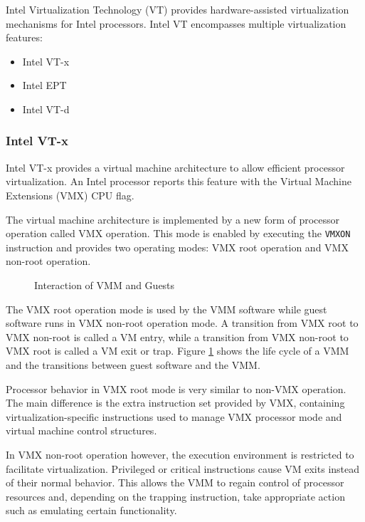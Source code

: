 Intel Virtualization Technology (VT) provides hardware-assisted
virtualization mechanisms for Intel processors. Intel VT encompasses multiple
virtualization features:
\begin{itemize}
	\item Intel VT-x
	\item Intel EPT
	\item Intel VT-d
\end{itemize}

\subsubsection{Intel VT-x}
Intel VT-x provides a virtual machine architecture to allow
efficient processor virtualization. An Intel processor reports this feature
with the Virtual Machine Extensions (VMX) CPU flag.

The virtual machine architecture is implemented by a new form of processor
operation called VMX operation. This mode is enabled by executing the
\texttt{VMXON} instruction and provides two operating modes: VMX root operation
and VMX non-root operation.

\begin{figure}[h]
	\centering
	
	\caption{Interaction of VMM and Guests}
	\label{fig:vmm-lifecycle}
\end{figure}

The VMX root operation mode is used by the VMM software while guest software
runs in VMX non-root operation mode. A transition from VMX root to VMX non-root
is called a VM entry, while a transition from VMX non-root to VMX root is called
a VM exit or trap. Figure \ref{fig:vmm-lifecycle} shows the life cycle of a VMM
and the transitions between guest software and the VMM.

Processor behavior in VMX root mode is very similar to non-VMX operation.  The
main difference is the extra instruction set provided by VMX, containing
virtualization-specific instructions used to manage VMX processor mode and
virtual machine control structures.

In VMX non-root operation however, the execution environment is restricted to
facilitate virtualization. Privileged or critical instructions cause VM exits
instead of their normal behavior. This allows the VMM to regain control of
processor resources and, depending on the trapping instruction, take
appropriate action such as emulating certain functionality.

